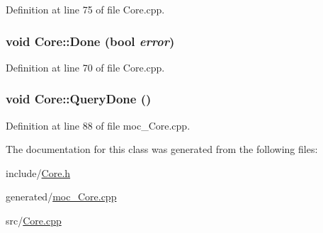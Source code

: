Definition at line 75 of file Core.cpp.\hypertarget{classCore_299d2e5e288da339e11f30500f473b16}{
\subsubsection{\setlength{\rightskip}{0pt plus 5cm}void Core::Done (bool {\em error})}}
\label{classCore_299d2e5e288da339e11f30500f473b16}




Definition at line 70 of file Core.cpp.\hypertarget{classCore_c74c19f85f549851d3d7afd7e449770b}{
\subsubsection{\setlength{\rightskip}{0pt plus 5cm}void Core::QueryDone ()}}
\label{classCore_c74c19f85f549851d3d7afd7e449770b}




Definition at line 88 of file moc\_\-Core.cpp.

The documentation for this class was generated from the following files:\begin{CompactItemize}
\item 
include/\hyperlink{Core_8h}{Core.h}\item 
generated/\hyperlink{moc__Core_8cpp}{moc\_\-Core.cpp}\item 
src/\hyperlink{Core_8cpp}{Core.cpp}\end{CompactItemize}

